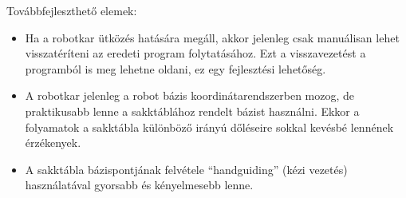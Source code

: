 \documentclass[../documentation.tex]{subfiles}
\begin{document}
Továbbfejleszthető elemek:
\begin{itemize}
	\item Ha a robotkar ütközés hatására megáll, akkor jelenleg csak manuálisan lehet visszatéríteni az eredeti program folytatásához. Ezt a visszavezetést a programból is meg lehetne oldani, ez egy fejlesztési lehetőség.
	\item A robotkar jelenleg a robot bázis koordinátarendszerben mozog, de praktikusabb lenne a sakktáblához rendelt bázist használni. Ekkor a folyamatok a sakktábla különböző irányú dőléseire sokkal kevésbé lennének érzékenyek.
	\item A sakktábla bázispontjának felvétele ``handguiding'' (kézi vezetés) használatával gyorsabb és kényelmesebb lenne.
\end{itemize}
\end{document}
